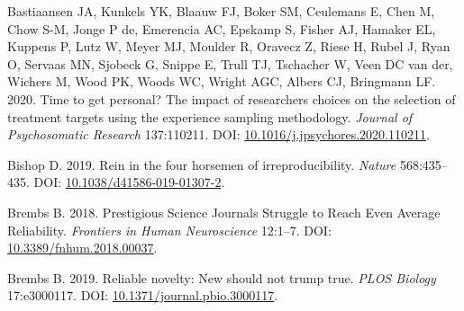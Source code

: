\documentclass[10pt,a4paper]{article}
\newlength{\cslhangindent}
\newlength{\cslentryspacingunit} %
\newenvironment{CSLReferences}[2] %
 {%
  \setlength{\parindent}{0pt}
  \ifodd #1
  \let\oldpar\par
  \def\par{\hangindent=\cslhangindent\oldpar}
  \fi
  \setlength{\parskip}{#2\cslentryspacingunit}
 }%
 {}
\begin{document}
\begin{CSLReferences}{1}{0}
\leavevmode{}%
Bastiaansen JA, Kunkels YK, Blaauw FJ, Boker SM, Ceulemans E, Chen M, Chow S-M, Jonge P de, Emerencia AC, Epskamp S, Fisher AJ, Hamaker EL, Kuppens P, Lutz W, Meyer MJ, Moulder R, Oravecz Z, Riese H, Rubel J, Ryan O, Servaas MN, Sjobeck G, Snippe E, Trull TJ, Tschacher W, Veen DC van der, Wichers M, Wood PK, Woods WC, Wright AGC, Albers CJ, Bringmann LF. 2020. Time to get personal? {The} impact of researchers choices on the selection of treatment targets using the experience sampling methodology. \emph{Journal of Psychosomatic Research} 137:110211. DOI: \href{https://doi.org/10.1016/j.jpsychores.2020.110211}{10.1016/j.jpsychores.2020.110211}.

\leavevmode{}%
Bishop D. 2019. Rein in the four horsemen of irreproducibility. \emph{Nature} 568:435--435. DOI: \href{https://doi.org/10.1038/d41586-019-01307-2}{10.1038/d41586-019-01307-2}.

\leavevmode{}%
Brembs B. 2018. Prestigious {Science} {Journals} {Struggle} to {Reach} {Even} {Average} {Reliability}. \emph{Frontiers in Human Neuroscience} 12:1--7. DOI: \href{https://doi.org/10.3389/fnhum.2018.00037}{10.3389/fnhum.2018.00037}.

\leavevmode{}%
Brembs B. 2019. Reliable novelty: {New} should not trump true. \emph{PLOS Biology} 17:e3000117. DOI: \href{https://doi.org/10.1371/journal.pbio.3000117}{10.1371/journal.pbio.3000117}.


\end{CSLReferences}
\end{document}
